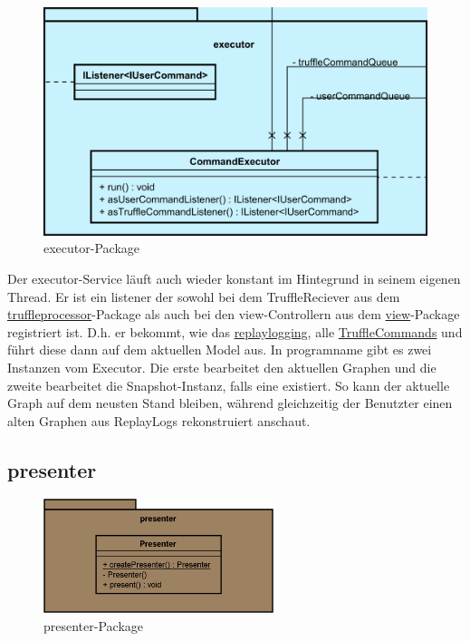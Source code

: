    \begin{figure}[H]
      \centering
      \includegraphics[width=\textwidth]{../diagramimages/executor.png}
      \caption{executor-Package}
    \end{figure}

    \medskip
    Der executor-Service läuft auch wieder konstant im Hintegrund in seinem
    eigenen Thread. Er ist ein \gls{listener} der sowohl bei dem TruffleReciever aus dem
    \hyperref[subsubsec:truffleprocessor]{truffleprocessor}-Package als
    auch bei den view-Controllern aus dem \hyperref[subsec:view]{view}-Package
    registriert ist. D.h. er bekommt, wie das \hyperref[subsubsec:replaylogging]{replaylogging},
    alle \hyperref[subsubsec:trufflecommand]{TruffleCommands} und führt diese
    dann auf dem aktuellen Model aus.
    \newline
    \newline
    In \gls{programname} gibt es zwei Instanzen vom Executor. Die erste bearbeitet
    den aktuellen Graphen und die zweite bearbeitet die Snapshot-Instanz, falls
    eine existiert. So kann der aktuelle Graph auf dem neusten Stand bleiben, während
    gleichzeitig der Benutzter einen alten Graphen aus
    ReplayLogs rekonstruiert anschaut.


\subsection{presenter}
\label{subsec:presenter}

\begin{figure}[H]
  \centering
  \includegraphics[width=0.6\textwidth]{../diagramimages/presenter.png}
  \caption{presenter-Package}
\end{figure}

